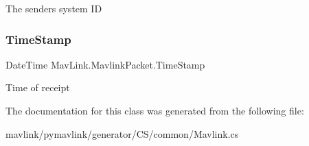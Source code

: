 The sender\textquotesingle{}s system ID 

\mbox{\label{classMavLink_1_1MavlinkPacket_a41ba9c38f178fadebcc0efebe42a94a2}} 
\subsubsection{\texorpdfstring{Time\+Stamp}{TimeStamp}}
{\footnotesize\ttfamily Date\+Time Mav\+Link.\+Mavlink\+Packet.\+Time\+Stamp}



Time of receipt 



The documentation for this class was generated from the following file\+:\begin{DoxyCompactItemize}
\item 
mavlink/pymavlink/generator/\+C\+S/common/Mavlink.\+cs\end{DoxyCompactItemize}
